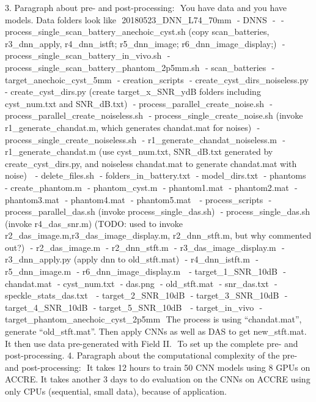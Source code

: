 \documentclass{article}
\begin{document}
3. Paragraph about pre- and post-processing:  You have data and you have models. Data folders look like  20180523_DNN_L74_70mm     - DNNS         -     - process_single_scan_battery_anechoic_cyst.sh (copy scan_batteries, r3_dnn_apply, r4_dnn_istft; r5_dnn_image; r6_dnn_image_display;)     - process_single_scan_battery_in_vivo.sh     - process_single_scan_battery_phantom_2p5mm.sh     - scan_batteries         - target_anechoic_cyst_5mm             - creation_scripts                 - create_cyst_dirs_noiseless.py                 - create_cyst_dirs.py (create target_x_SNR_ydB folders including cyst_num.txt and SNR_dB.txt)                 - process_parallel_create_noise.sh                 - process_parallel_create_noiseless.sh                 - process_single_create_noise.sh (invoke r1_generate_chandat.m, which generates chandat.mat for noises)                 - process_single_create_noiseless.sh                 - r1_generate_chandat_noiseless.m                 - r1_generate_chandat.m (use cyst_num.txt, SNR_dB.txt generated by create_cyst_dirs.py, and noiseless chandat.mat to generate chandat.mat with noise)              - delete_files.sh             - folders_in_battery.txt             - model_dirs.txt             - phantoms                 - create_phantom.m                 - phantom_cyst.m                 - phantom1.mat                 - phantom2.mat                 - phantom3.mat                 - phantom4.mat                 - phantom5.mat              - process_scripts                 - process_parallel_das.sh (invoke process_single_das.sh)                 - process_single_das.sh (invoke r4_das_snr.m) (TODO: used to invoke r2_das_image.m,r3_das_image_display.m, r2_dnn_stft.m, but why commented out?)                 - r2_das_image.m                 - r2_dnn_stft.m                 - r3_das_image_display.m                 - r3_dnn_apply.py (apply dnn to old_stft.mat)                 - r4_dnn_istft.m                 - r5_dnn_image.m                 - r6_dnn_image_display.m              - target_1_SNR_10dB                 - chandat.mat                 - cyst_num.txt                 - das.png                 - old_stft.mat                 - snr_das.txt                 - speckle_stats_das.txt              - target_2_SNR_10dB             - target_3_SNR_10dB             - target_4_SNR_10dB             - target_5_SNR_10dB          - target_in_vivo         - target_phantom_anechoic_cyst_2p5mm  The process is using “chandat.mat”, generate “old_stft.mat”. Then apply CNNs as well as DAS to get new_stft.mat. It then use data pre-generated with Field II.  To set up the complete pre- and post-processing.
4. Paragraph about the computational complexity of the pre- and post-processing:  It takes 12 hours to train 50 CNN models using 8 GPUs on ACCRE. It takes another 3 days to do evaluation on the CNNs on ACCRE using only CPUs (sequential, small data), because of application.
\end{document}
